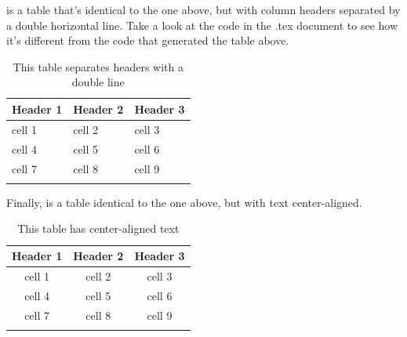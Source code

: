 \documentclass[output=paper,colorlinks,citecolor=brown,
]{langscibook}
\begin{document}

 is a table that's identical to the one above, but with column headers separated by a double horizontal line. Take a look at the code in the .tex document to see how it's different from the code that generated the table above. %

\begin{table}

  \caption{This table separates headers with a double line}
  \label{tab:diercks:SampleTableHeaders}
  
\begin{tabular}{lll}
\lsptoprule %
Header 1 & Header 2 & Header 3 \\
\midrule\midrule
cell 1 & cell 2 & cell 3 \\
cell 4 & cell 5 & cell 6 \\
cell 7 & cell 8 & cell 9 \\
\lspbottomrule %


\end{tabular}
\end{table}

\noindent Finally,  is a table identical to the one above, but with text center-aligned.

\begin{table}

  \caption{This table has center-aligned text}
  \label{tab:diercks:SampleTableCenter}

\begin{tabular}{ccc}
\lsptoprule %
Header 1 & Header 2 & Header 3 \\
\midrule\midrule
cell 1 & cell 2 & cell 3 \\
cell 4 & cell 5 & cell 6 \\
cell 7 & cell 8 & cell 9 \\
\lspbottomrule %

\end{tabular}
\end{table}
\end{document}
